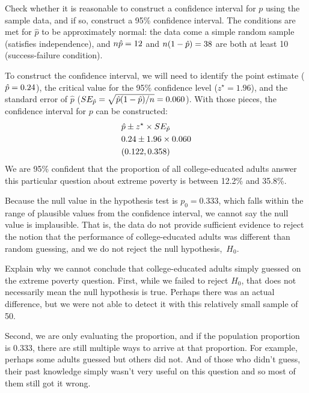 \begin{examplewrap}
\begin{nexample}{Check whether it is reasonable to construct
    a confidence interval for $p$ using the sample data, and
    if so, construct a 95\% confidence interval.}
  The conditions are met for $\hat{p}$ to be approximately
  normal: the data come a simple random sample (satisfies
  independence), and $n\hat{p} = 12$ and
  $n(1 - \hat{p}) = 38$ are both
  at least 10 (success-failure condition).

  To construct the confidence interval, we will need to identify
  the point estimate ($\hat{p} = 0.24$), the critical value for
  the 95\% confidence level ($z^{\star} = 1.96$), and the standard
  error of $\hat{p}$
  ($SE_{\hat{p}} = \sqrt{\hat{p}(1 - \hat{p}) / n} = 0.060$).
  With those pieces, the confidence interval for $p$ can be
  constructed:
  \begin{align*}
    &\hat{p} \pm z^{\star} \times SE_{\hat{p}} \\
    &0.24 \pm 1.96 \times 0.060 \\
    &(0.122, 0.358)
  \end{align*}
  We are 95\% confident that the proportion of all
  college-educated adults answer this particular question
  about extreme poverty is between 12.2\%
  and 35.8\%.
\end{nexample}
\end{examplewrap}

Because the null value in the hypothesis test is $p_0 = 0.333$,
which falls within the range of plausible values from the
confidence interval, we cannot say the null value is implausible.
That is, the data do not provide sufficient evidence to reject
the notion that the performance of college-educated
adults was different than random guessing,
and we do not reject the null hypothesis,~$H_0$.

\begin{examplewrap}
\begin{nexample}{Explain why we cannot conclude that
    college-educated adults simply guessed on the extreme
    poverty question.}
  First, while we failed to reject $H_0$, that does not
  necessarily mean the null hypothesis is true.
  Perhaps there was an actual difference,
  but we were not able to detect it with this
  relatively small sample of 50.

  Second, we are only evaluating the proportion,
  and if the population proportion is 0.333,
  there are still multiple ways to arrive at that proportion.
  For example,
  perhaps some adults guessed but others did not.
  And of those who didn't guess,
  their past knowledge simply wasn't very useful on this
  question and so most of them still got it wrong.
\end{nexample}
\end{examplewrap}

